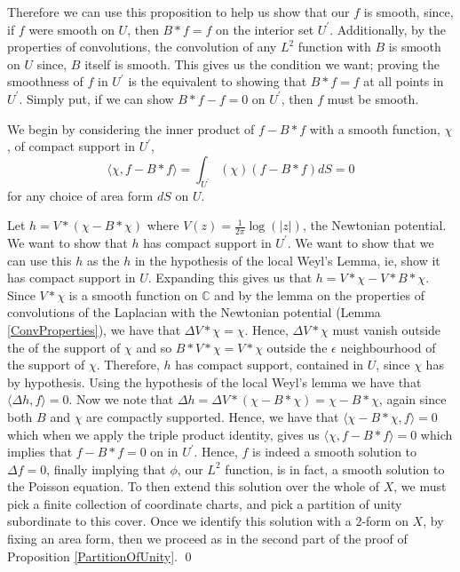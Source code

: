 \documentclass[11pt]{report}
\theoremstyle{definition}
\begin{document}
Therefore we can use this proposition to help us show that our $f$ is smooth, since, if $f$ were smooth on $U$, then $B*f = f$ on the interior set $U^{\prime}$. Additionally, by the properties of convolutions, the convolution of any $L^2$ function with $B$ is smooth on $U$ since, $B$ itself is smooth. This gives us the condition we want; proving the smoothness of $f$ in $U^{\prime}$ is the equivalent to showing that $B*f = f$ at all points in $U^{\prime}$. Simply put, if we can show $B*f - f = 0$ on $U^{\prime}$, then $f$ must be smooth. 

We begin by considering the inner product of $f-B*f$ with a smooth function, $\chi$, of compact support in $U^{\prime}$, \[\langle \chi, f-B*f\rangle = \int_{U^{\prime}} (\chi)(f-B*f)dS = 0 \] for any choice of area form $dS$ on $U$. 

Let $h = V*(\chi-B*\chi)$ where $V(z) = \frac{1}{2\pi}\log(|z|)$, the Newtonian potential. We want to show that $h$ has compact support in $U^{\prime}$. We want to show that we can use this $h$ as the $h$ in the hypothesis of the local Weyl's Lemma, ie, show it has compact support in $U$. Expanding this gives us that $h = V*\chi - V*B*\chi$. Since $V*\chi$ is a smooth function on $\mathbb{C}$ and by the lemma on the properties of convolutions of the Laplacian with the Newtonian potential (Lemma \ref{ConvProperties}), we have that $\Delta V*\chi = \chi$. Hence, $\Delta V*\chi$ must vanish outside the of the support of $\chi$ and so $B*V*\chi = V*\chi$ outside the $\epsilon$ neighbourhood of the support of $\chi$. Therefore, $h$ has compact support, contained in $U$, since $\chi$ has by hypothesis. Using the hypothesis of the local Weyl's lemma we have that $\langle \Delta h, f\rangle = 0$. Now we note that $\Delta h = \Delta V*(\chi - B*\chi) = \chi - B*\chi$, again since both $B$ and $\chi$ are compactly supported. Hence, we have that $\langle \chi - B*\chi, f \rangle = 0 $ which when we apply the triple product identity, gives us $\langle \chi, f - B*f \rangle = 0$ which implies that $f-B*f = 0$ on in $U^{\prime}$. Hence, $f$ is indeed a smooth solution to $\Delta f = 0$, finally implying that $\phi$, our $L^2$ function, is in fact, a smooth solution to the Poisson equation.
To then extend this solution over the whole of $X$, we must pick a finite collection of coordinate charts, and pick a partition of unity subordinate to this cover. Once we identify this solution with a $2$-form on $X$, by fixing an area form, then we proceed as in the second part of the proof of Proposition \ref{PartitionOfUnity}. \qed
\end{document}
